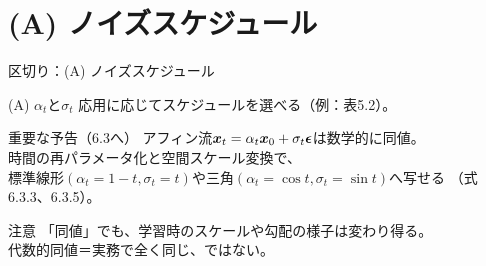 \section{(A) ノイズスケジュール}
\asmain
\begin{frame}{区切り：(A) ノイズスケジュール}
    \tableofcontents[currentsection]
\end{frame}
\asmain
\begin{frame}{(A) $\alpha_t$と$\sigma_t$}
    応用に応じてスケジュールを選べる（例：表5.2）。
    \begin{block}{重要な予告（6.3へ）}
        アフィン流$\bm{x}_t=\alpha_t\bm{x}_0+\sigma_t\bm{\epsilon}$は数学的に同値。\\
        時間の再パラメータ化と空間スケール変換で、\\
        標準線形$(\alpha_t=1-t,\sigma_t=t)$や三角$(\alpha_t=\cos t,\sigma_t=\sin t)$へ写せる
        （式6.3.3、6.3.5）。
    \end{block}
    \begin{alertblock}{注意}
        「同値」でも、学習時のスケールや勾配の様子は変わり得る。\\
        代数的同値＝実務で全く同じ、ではない。
    \end{alertblock}
\end{frame}

